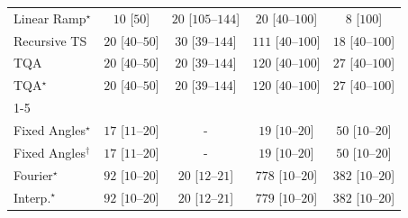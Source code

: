 \begin{tabular}{l|cccc|}
Linear Ramp$^\star$ & {\cellcolor[HTML]{F7FCF5}} \color[HTML]{000000} $10$ [$50$] & {\cellcolor[HTML]{F5FBF2}} \color[HTML]{000000} $20$ [$105$--$144$] & {\cellcolor[HTML]{F5FBF2}} \color[HTML]{000000} $20$ [$40$--$100$] & {\cellcolor[HTML]{F7FCF5}} \color[HTML]{000000} $8$ [$100$] \\
Recursive TS & {\cellcolor[HTML]{F5FBF2}} \color[HTML]{000000} $20$ [$40$--$50$] & {\cellcolor[HTML]{F3FAF0}} \color[HTML]{000000} $30$ [$39$--$144$] & {\cellcolor[HTML]{E3F4DE}} \color[HTML]{000000} $111$ [$40$--$100$] & {\cellcolor[HTML]{F5FBF3}} \color[HTML]{000000} $18$ [$40$--$100$] \\
TQA & {\cellcolor[HTML]{F5FBF2}} \color[HTML]{000000} $20$ [$40$--$50$] & {\cellcolor[HTML]{F5FBF2}} \color[HTML]{000000} $20$ [$39$--$144$] & {\cellcolor[HTML]{E0F3DB}} \color[HTML]{000000} $120$ [$40$--$100$] & {\cellcolor[HTML]{F4FBF1}} \color[HTML]{000000} $27$ [$40$--$100$] \\
TQA$^\star$ & {\cellcolor[HTML]{F5FBF2}} \color[HTML]{000000} $20$ [$40$--$50$] & {\cellcolor[HTML]{F5FBF2}} \color[HTML]{000000} $20$ [$39$--$144$] & {\cellcolor[HTML]{E0F3DB}} \color[HTML]{000000} $120$ [$40$--$100$] & {\cellcolor[HTML]{F4FBF1}} \color[HTML]{000000} $27$ [$40$--$100$] \\
\cline{1-5}
\multicolumn{5}{c}{\rule{0pt}{8pt}SV} \\
\midrule
Fixed Angles$^\star$ & {\cellcolor[HTML]{F5FBF3}} \color[HTML]{000000} $17$ [$11$--$20$] & {\cellcolor[HTML]{000000}} \color[HTML]{F1F1F1} {\cellcolor{white}} \color{black} - & {\cellcolor[HTML]{F5FBF3}} \color[HTML]{000000} $19$ [$10$--$20$] & {\cellcolor[HTML]{EFF9EC}} \color[HTML]{000000} $50$ [$10$--$20$] \\
Fixed Angles$^\dagger$ & {\cellcolor[HTML]{F5FBF3}} \color[HTML]{000000} $17$ [$11$--$20$] & {\cellcolor[HTML]{000000}} \color[HTML]{F1F1F1} {\cellcolor{white}} \color{black} - & {\cellcolor[HTML]{F5FBF3}} \color[HTML]{000000} $19$ [$10$--$20$] & {\cellcolor[HTML]{EFF9EC}} \color[HTML]{000000} $50$ [$10$--$20$] \\
Fourier$^\star$ & {\cellcolor[HTML]{E7F6E3}} \color[HTML]{000000} $92$ [$10$--$20$] & {\cellcolor[HTML]{F5FBF2}} \color[HTML]{000000} $20$ [$12$--$21$] & {\cellcolor[HTML]{00441B}} \color[HTML]{F1F1F1} $778$ [$10$--$20$] & {\cellcolor[HTML]{79C67A}} \color[HTML]{000000} $382$ [$10$--$20$] \\
Interp.$^\star$ & {\cellcolor[HTML]{E7F6E3}} \color[HTML]{000000} $92$ [$10$--$20$] & {\cellcolor[HTML]{F5FBF2}} \color[HTML]{000000} $20$ [$12$--$21$] & {\cellcolor[HTML]{00441B}} \color[HTML]{F1F1F1} $779$ [$10$--$20$] & {\cellcolor[HTML]{79C67A}} \color[HTML]{000000} $382$ [$10$--$20$] \\

\end{tabular}
